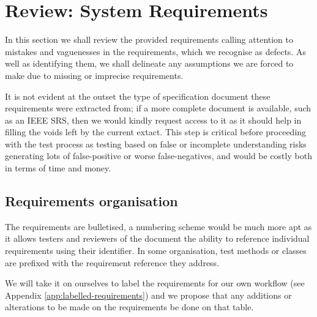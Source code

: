 \section{Review: System Requirements}

In this section we shall review the provided requirements calling attention to mistakes and vaguenesses in the requirements, which we recognise as defects. As well as identifying them, we shall delineate any assumptions we are forced to make due to missing or imprecise requirements. 

It is not evident at the outset the type of specification document these requirements were extracted from; if a more complete document is available, such as an IEEE SRS, then we would kindly request access to it as it should help in filling the voids left by the current extact.  
This step is critical before proceeding with the test process as testing based on false or incomplete understanding risks generating lots of false-positive or worse false-negatives, and would be costly both in terms of time and money. 
\par

\subsection{Requirements organisation}
The requirements are bulletised, a numbering scheme would be much more apt as it allows testers and reviewers of the document the ability to reference individual requirements using their identifier. In some organisation, test methods or classes are prefixed with the requirement reference they address. 

We will take it on ourselves to label the requirements for our own workflow (see Appendix \ref{app:labelled-requirements}) and we propose that any additions or alterations to be made on the requirements be done on that table.


